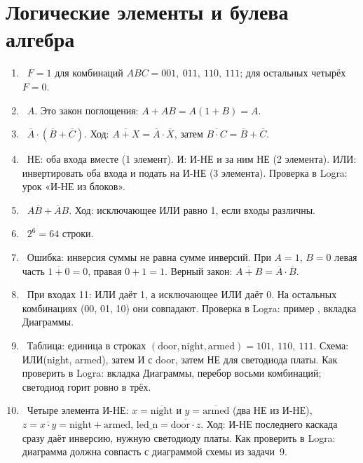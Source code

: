 \section*{Логические элементы и булева алгебра}
\begin{enumerate}
  \item {}~$F=1$ для комбинаций $ABC = 001,\ 011,\ 110,\ 111$; для остальных четырёх $F=0$.
  \item {}~$A$. Это закон поглощения: $A + AB = A(1+B) = A$.
  \item {}~$\overline{A}\cdot(\overline{B}+\overline{C})$. Ход: $\overline{A+X}=\overline{A}\cdot\overline{X}$, затем $\overline{B\cdot C}=\overline{B}+\overline{C}$.
  \item {}~НЕ: оба входа вместе (1 элемент). И: И-НЕ и за ним НЕ (2 элемента). ИЛИ: инвертировать оба входа и подать на И-НЕ (3 элемента). Проверка в Logra: урок «И-НЕ из блоков».
  \item {}~$A\overline{B}+\overline{A}B$. Ход: исключающее ИЛИ равно 1, если входы различны.
  \item {}~$2^6=64$ строки.
  \item {}~Ошибка: инверсия суммы не равна сумме инверсий. При $A=1$, $B=0$ левая часть $\overline{1+0}=0$, правая $0+1=1$. Верный закон: $\overline{A+B}=\overline{A}\cdot\overline{B}$.
  \item {}~При входах 11: ИЛИ даёт 1, а исключающее ИЛИ даёт 0. На остальных комбинациях (00, 01, 10) они совпадают. Проверка в Logra: пример , вкладка Диаграммы.
  \item {}~Таблица: единица в строках $(\text{door},\text{night},\text{armed})=101,\ 110,\ 111$. Схема: ИЛИ(night, armed), затем И с door, затем НЕ для светодиода платы. Как проверить в Logra: вкладка Диаграммы, перебор восьми комбинаций; светодиод горит ровно в трёх.
  \item {}~Четыре элемента И-НЕ: $x=\overline{\text{night}}$ и $y=\overline{\text{armed}}$ (два НЕ из И-НЕ), $z=\overline{x\cdot y}=\text{night}+\text{armed}$, $\text{led\_n}=\overline{\text{door}\cdot z}$. Ход: И-НЕ последнего каскада сразу даёт инверсию, нужную светодиоду платы. Как проверить в Logra: диаграмма должна совпасть с диаграммой схемы из задачи~9.
\end{enumerate}

